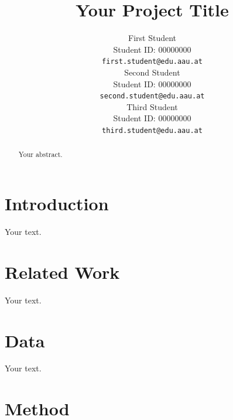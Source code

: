 \documentclass{article}
\title{Your Project Title}
\author{%
  First Student \\
  Student ID: 00000000 \\
  \texttt{first.student@edu.aau.at} \\
  \And
  Second Student \\
  Student ID: 00000000 \\
  \texttt{second.student@edu.aau.at} \\
  \And
  Third Student \\
  Student ID: 00000000 \\
  \texttt{third.student@edu.aau.at} \\
}
\begin{document}
\maketitle

\begin{abstract}
Your abstract.
\end{abstract}

\section{Introduction}

Your text.

\section{Related Work}

Your text.

\section{Data}

Your text.

\section{Method}
\end{document}
